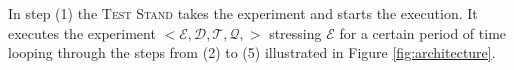 In step (1) the \textsc{Test Stand} takes the experiment and starts the execution. It executes the experiment $<\mathcal{E},\mathcal{D},\mathcal{T},\mathcal{Q},>$ stressing $\mathcal{E}$ for a certain period of time looping through the steps from (2) to (5) illustrated in Figure \ref{fig:architecture}.                                                                                                                                                                                                                                                                                                                                                                                                                                                                                                                                                                                                                                                                                                                                                                                                                                                                                                                                                                                                                                                                                                                                                                                                                                                                                                                                                                                                                                                                                                                                                                                                                                                                                                                                                                                                                                                                                                                                                                                                                                                                                                                                                                                                                                                                                                                                                                                                                                                                                                                                                                                                                                                                                                                                                                                                                                                                                                                                                                                                                                                                                                                                                         